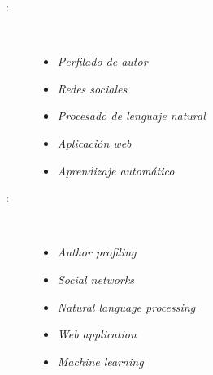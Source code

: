 \begin{multicols}{2}
\begin{description}
\item [\palabraschaveprincipal:] \mbox{} \\[-20pt]
  \begin{itemize}
    \item \textit{Perfilado de autor}
    \item \textit{Redes sociales}
    \item \textit{Procesado de lenguaje natural}
    \item \textit{Aplicación web}
    \item \textit{Aprendizaje automático}
  \end{itemize}
\end{description}
\begin{description}
\item [\palabraschavesecundaria:] \mbox{} \\[-20pt]
  \begin{itemize}
    \item \textit{Author profiling}
    \item \textit{Social networks}
    \item \textit{Natural language processing}
    \item \textit{Web application}
    \item \textit{Machine learning}
  \end{itemize}
\end{description}
\end{multicols}
